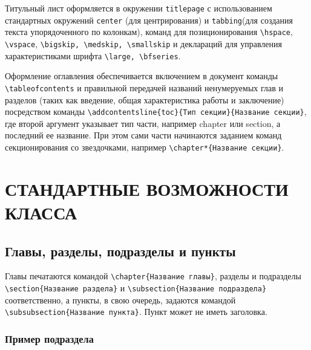 Титульный лист оформляется в окружении \verb|titlepage| с использованием стандартных окружений \verb|center| (для центрирования) и  \verb|tabbing|(для создания текста упорядоченного по колонкам), команд для позиционирования \verb|\hspace|, \verb|\vspace|, \verb|\bigskip, \medskip, \smallskip| и деклараций для управления характеристиками шрифта \verb|\large, \bfseries|.

Оформление оглавления обеспечивается включением в документ команды
\verb|\tableofcontents| и правильной передачей названий ненумеруемых глав и
разделов (таких как введение, общая характеристика работы и заключение)
посредством команды \verb|\addcontentsline{toc}{Тип секции}{Название секции}|,
где второй аргумент указывает тип части, например chapter или section, а
последний ее название. При этом сами части начинаются заданием команд
секционирования со звездочками, например \verb|\chapter*{Название секции}|.

\newpage
\chapter{СТАНДАРТНЫЕ ВОЗМОЖНОСТИ КЛАССА}

\section{Главы, разделы, подразделы и пункты}

Главы печатаются командой \verb|\chapter{Название главы}|, разделы и подразделы
\verb|\section{Название раздела}| и \verb|\subsection{Название подраздела}|
соответственно, а пункты, в свою очередь, задаются командой
\verb|\subsubsection{Название пункта}|. Пункт может не иметь заголовка.

\subsection{Пример подраздела}

